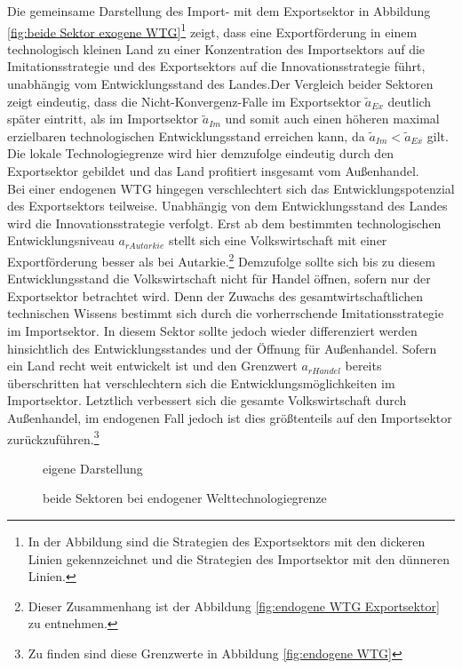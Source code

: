 %
Die gemeinsame Darstellung des Import- mit dem Exportsektor in Abbildung \ref{fig:beide Sektor exogene WTG}\footnote{In der Abbildung sind die Strategien des Exportsektors mit den dickeren Linien gekennzeichnet und die Strategien des Importsektor mit den dünneren Linien.}  zeigt, dass eine Exportförderung in einem technologisch kleinen Land zu einer Konzentration des Importsektors auf die Imitationsstrategie und des Exportsektors auf die Innovationsstrategie führt, unabhängig vom Entwicklungsstand des Landes.Der Vergleich beider Sektoren zeigt eindeutig, dass die Nicht-Konvergenz-Falle im Exportsektor $\tilde{a}_{Ex}$ deutlich später eintritt, als im Importsektor $\tilde{a}_{Im}$ und somit auch einen höheren maximal erzielbaren technologischen Entwicklungsstand erreichen kann, da $\tilde{a}_{Im}<\tilde{a}_{Ex}$ gilt. Die lokale Technologiegrenze wird hier demzufolge eindeutig durch den Exportsektor gebildet und das Land profitiert insgesamt vom Außenhandel.\\ 
%
Bei einer endogenen WTG hingegen verschlechtert sich das Entwicklungspotenzial des Exportsektors teilweise. Unabhängig von dem Entwicklungsstand des Landes wird die Innovationsstrategie verfolgt. Erst ab dem bestimmten technologischen Entwicklungsniveau $a_{rAutarkie}$ stellt sich eine Volkswirtschaft mit einer Exportförderung besser als bei Autarkie.\footnote{Dieser Zusammenhang ist der Abbildung \ref{fig:endogene WTG Exportsektor} zu entnehmen.} Demzufolge sollte sich bis zu diesem Entwicklungsstand die Volkswirtschaft nicht für Handel öffnen, sofern nur der Exportsektor betrachtet wird. Denn der Zuwachs des gesamtwirtschaftlichen technischen Wissens bestimmt sich durch die vorherrschende Imitationsstrategie im Importsektor. In diesem Sektor sollte jedoch wieder differenziert werden hinsichtlich des Entwicklungsstandes und der Öffnung für Außenhandel. Sofern ein Land recht weit entwickelt ist und den Grenzwert $a_{rHandel}$ bereits überschritten hat verschlechtern sich die Entwicklungsmöglichkeiten im Importsektor. Letztlich verbessert sich die gesamte Volkswirtschaft durch Außenhandel, im endogenen Fall jedoch ist dies größtenteils auf den Importsektor zurückzuführen.\footnote{Zu finden sind diese Grenzwerte in Abbildung \ref{fig:endogene WTG}} 
%		
	\begin{figure}[h!] 
		\vspace{0.13cm}
		\hfill{}  eigene Darstellung
		\caption{beide Sektoren bei endogener Welttechnologiegrenze}
		\label{fig:beideSektorenendogeneWTG}
	\end{figure}
